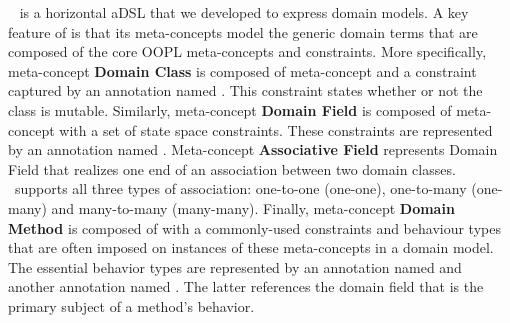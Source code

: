 ~\cite{le_domain_2018} is a horizontal aDSL that we developed to express domain models.
A key feature of  is that its meta-concepts model the generic domain terms that are composed of the core OOPL meta-concepts and constraints. More specifically, meta-concept \textbf{Domain Class} is composed of meta-concept  and a constraint captured by an annotation named . This constraint states whether or not the class is mutable. Similarly, meta-concept \textbf{Domain Field} is composed of meta-concept  with a set of state space constraints. 
These constraints are represented by an annotation named . 
Meta-concept \textbf{Associative Field} represents Domain Field that realizes one end of an association between two domain classes. \dcsl~supports all three types of association: one-to-one (\abbr one-one), one-to-many (\abbr one-many) and many-to-many (\abbr many-many). 
Finally, meta-concept \textbf{Domain Method} is composed of  with a commonly-used constraints and behaviour types that are often imposed on instances of these meta-concepts in a domain model. The essential behavior types are represented by an annotation named  and another annotation named . The latter references the domain field that is the primary subject of a method's behavior.



